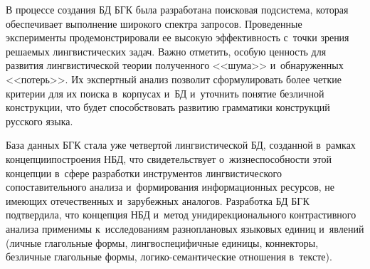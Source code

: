 \begin{multicols}{2}
  В процессе создания БД БГК была разработана поисковая подсистема, 
которая обеспечивает выполнение широкого спектра запросов. Проведенные 
эксперименты продемонстрировали ее высокую эффективность с~точки зрения 
решаемых лингвистических задач. Важно отметить, особую ценность для 
развития лингвистической теории полученного <<шума>> и~обнаруженных 
<<потерь>>. Их экспертный анализ позволит сформулировать более четкие 
критерии для их поиска в~корпусах и~БД и~уточнить понятие 
безличной конструкции, что будет способствовать развитию грамматики 
конструкций русского языка. 
  
  База данных БГК стала уже четвертой лингвистической БД, созданной 
в~рамках концепции\linebreak построения НБД, что свидетельствует 
о~жизнеспособности этой концепции в~сфере разработки инструментов 
лингвистического сопоставительного анализа и~формирования 
информационных ресурсов, не имеющих отечественных и~зарубежных 
аналогов. Разработка БД БГК подтвердила, что концепция НБД и~метод 
унидирекционального контрастивного анализа применимы к~исследованиям 
разноплановых языковых единиц и~явлений (личные глагольные формы, 
лингвоспецифичные единицы, коннекторы, безличные глагольные формы,  
ло\-ги\-ко-се\-ман\-ти\-че\-ские отношения в~тексте).
  

\end{multicols}
